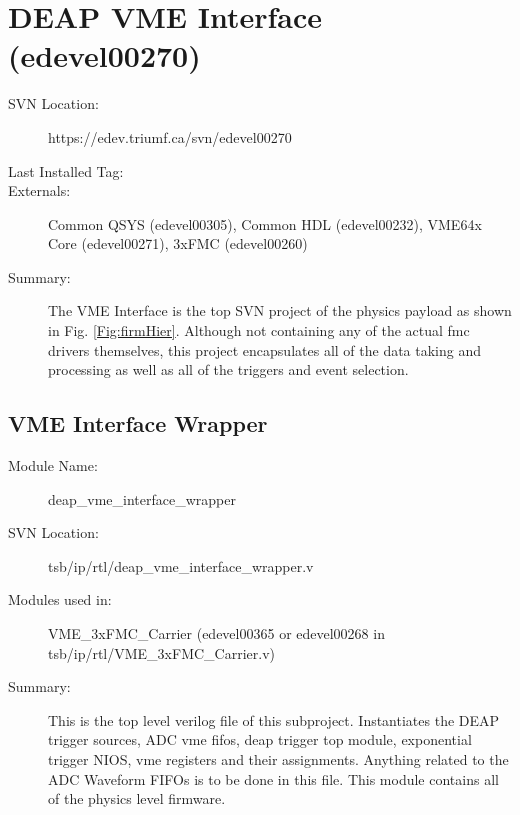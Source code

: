 \section{DEAP VME Interface (edevel00270)} 
\label{sec:270}
\begin{description}
\item[SVN Location:] https://edev.triumf.ca/svn/edevel00270
\item[Last Installed Tag:] \tagTwoSevenZero %
\item[Externals:] Common QSYS (edevel00305), Common HDL (edevel00232), VME64x Core (edevel00271), 3xFMC (edevel00260)
\item[Summary:] The VME Interface is the top SVN project of the physics payload as shown in Fig. \ref{Fig:firmHier}. Although not containing any of the actual \gls{fmc} drivers themselves, this project encapsulates all of the data taking and processing as well as all of the triggers and event selection.
\end{description}

	\subsection{VME Interface Wrapper} 
	\label{sec:vmeWrapper}
	\begin{description}
	\item[Module Name:] deap\_vme\_interface\_wrapper
	\item[SVN Location:]  tsb/ip/rtl/deap\_vme\_interface\_wrapper.v
	\item[Modules used in:] VME\_3xFMC\_Carrier (edevel00365 or edevel00268 in tsb/ip/rtl/VME\_3xFMC\_Carrier.v)
	\item[Summary: ]This is the top level verilog file of this subproject. Instantiates the DEAP trigger sources, ADC \gls{vme} \gls{fifo}s, \gls{deap} trigger top module, exponential trigger NIOS, \gls{vme} registers and their assignments. Anything related to the ADC Waveform FIFOs is to be done in this file. This module contains all of the physics level firmware.
	\end{description}

	

